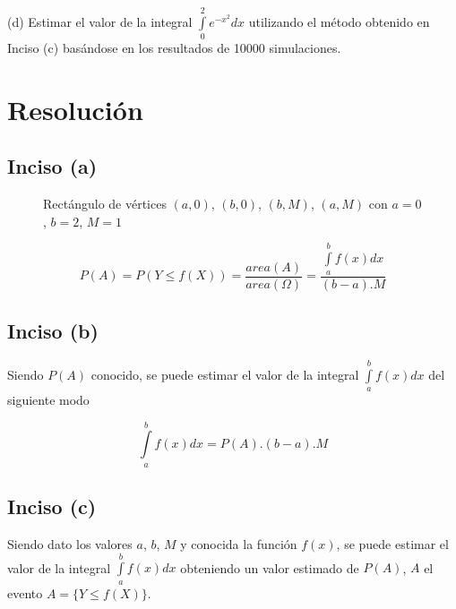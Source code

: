 \documentclass[a4paper]{article}
\begin{document}
(d) Estimar el valor de la integral $\int\limits_0^2 e^{-x^{2}} dx$ utilizando
el método obtenido en Inciso (c) basándose en los resultados de 10000
simulaciones.

\section{Resolución}
\subsection{Inciso (a)}
\begin{figure}[h]
  \centering
  \caption{Rectángulo de vértices $(a, 0)$, $(b, 0)$, $(b, M)$, $(a, M)$ con $a=0$, $b=2$, $M=1$}
\end{figure}

\[
  P(A) = P( Y \leqslant f(X) ) = \frac{ area(A) }{ area(\Omega) } =
  \frac{ \int\limits_a^b f(x) dx }{ (b-a) . M }
\]

\newpage
\subsection{Inciso (b)}

Siendo $P(A)$ conocido, se puede estimar el valor de la integral
$\int\limits_a^b f(x) dx$ del siguiente modo

\[
  \int\limits_a^b f(x) dx = P(A).(b-a) . M
\]

\subsection{Inciso (c)}
Siendo dato los valores $a$, $b$, $M$ y conocida la función $f(x)$, se puede
estimar el valor de la integral $\int\limits_a^b f(x) dx$ obteniendo un valor
estimado de $P(A)$, $A$ el evento $A = \{ Y \leqslant f(X) \}$. \\
\end{document}

